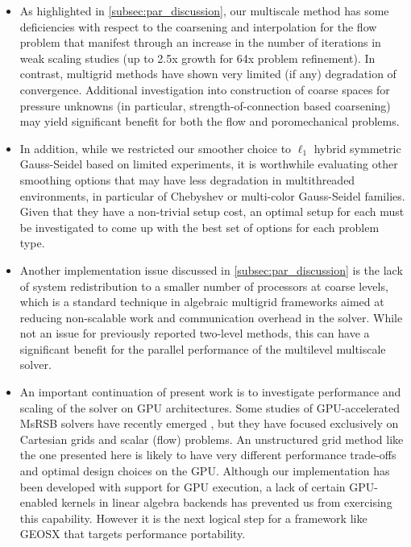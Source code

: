 \begin{itemize}
  \item As highlighted in \cref{subsec:par_discussion}, our multiscale method has some deficiencies with respect to the coarsening and interpolation for the flow problem that manifest through an increase in the number of iterations in weak scaling studies (up to 2.5x growth for 64x problem refinement).   In contrast, multigrid methods have shown very limited (if any) degradation of convergence.   Additional investigation into construction of coarse spaces for pressure unknowns (in particular, strength-of-connection based coarsening) may yield significant benefit for both the flow and poromechanical problems.
  \item In addition, while we restricted our smoother choice to $\ell_1$ hybrid symmetric Gauss-Seidel based on limited experiments, it is worthwhile evaluating other smoothing options that may have less degradation in multithreaded environments, in particular of Chebyshev or multi-color Gauss-Seidel families.   Given that they have a non-trivial setup cost, an optimal setup for each must be investigated to come up with the best set of options for each problem type.
  \item Another implementation issue discussed in \cref{subsec:par_discussion} is the lack of system redistribution to a smaller number of processors at coarse levels, which is a standard technique in algebraic multigrid frameworks aimed at  reducing non-scalable work and communication overhead in the solver.   While not an issue for previously reported two-level methods, this can have a significant benefit for the parallel performance of the multilevel multiscale solver.
  \item An important continuation of present work is to investigate performance and scaling of the solver on GPU architectures.   Some studies of GPU-accelerated MsRSB solvers have recently emerged \cite{Manea2021,Manea2022}, but they have focused exclusively on Cartesian grids and scalar (flow) problems.   An unstructured grid method like the one presented here is likely to have very different performance trade-offs and optimal design choices on the GPU.   Although our implementation has been developed with support for GPU execution, a lack of certain GPU-enabled kernels in linear algebra backends has prevented us from exercising this capability.   However it is the next logical step for a framework like GEOSX that targets performance portability.
\end{itemize} 

